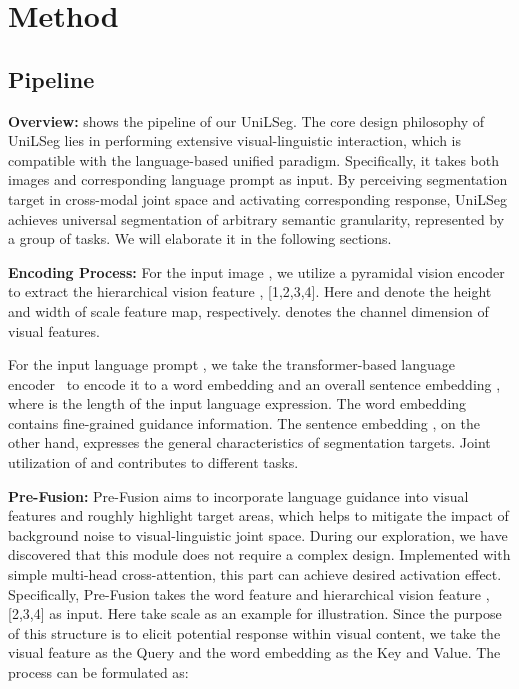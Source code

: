 \documentclass[10pt,twocolumn,letterpaper]{article}
\newcommand{\MethodName}{UniLSeg\xspace}
\begin{document}
\section{Method}

\subsection{Pipeline}

\textbf{Overview: } shows the pipeline of our \MethodName. The core design philosophy of \MethodName lies in performing extensive visual-linguistic interaction, which is compatible with the language-based unified paradigm.  Specifically, it takes both images and corresponding language prompt as input. By perceiving segmentation target in cross-modal joint space and activating corresponding response, \MethodName achieves universal segmentation of arbitrary semantic granularity, represented by a group of tasks.
We will elaborate it in the following sections.

\vspace{5pt}
\noindent \textbf{Encoding Process:}
For the input image , we utilize a pyramidal vision encoder~\cite{swin} to extract the hierarchical vision feature ,  [1,2,3,4].
Here  and  denote the height and width of  scale feature map, respectively.  denotes the channel dimension of visual features.

For the input language prompt , we take the transformer-based language encoder~\cite{CLIP} to encode it to a word embedding  and an overall sentence embedding , where  is the length of the input language expression.
The word embedding  contains fine-grained guidance information.
The sentence embedding , on the other hand, expresses the general characteristics of segmentation targets.
Joint utilization of  and  contributes to different tasks.

\vspace{5pt}
\noindent \textbf{Pre-Fusion:}
Pre-Fusion aims to incorporate language guidance into visual features and 
roughly highlight target areas, which helps to mitigate the impact of background noise to visual-linguistic joint space. 
During our exploration, we have discovered that this module does not require a complex design.
Implemented with simple multi-head cross-attention, this part can achieve desired activation effect.
Specifically, Pre-Fusion takes the word feature  and hierarchical vision feature ,  [2,3,4] as input. Here take  scale as an example for illustration. Since the purpose of this structure is to elicit potential response within visual content, we take the visual feature  as the Query and the word embedding  as the Key and Value. The process can be formulated as:
\end{document}
